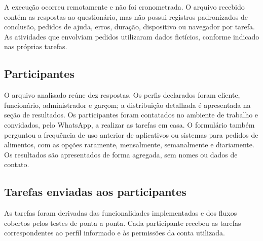 A execução ocorreu remotamente e não foi cronometrada. O arquivo recebido contém as respostas ao questionário, mas não possui registros padronizados de conclusão, pedidos de ajuda, erros, duração, dispositivo ou navegador por tarefa. As atividades que envolviam pedidos utilizaram dados fictícios, conforme indicado nas próprias tarefas.

\subsection{Participantes}

O arquivo analisado reúne dez respostas. Os perfis declarados foram cliente, funcionário, administrador e garçom; a distribuição detalhada é apresentada na seção de resultados. Os participantes foram contatados no ambiente de trabalho e convidados, pelo WhatsApp, a realizar as tarefas em casa. O formulário também perguntou a frequência de uso anterior de aplicativos ou sistemas para pedidos de alimentos, com as opções raramente, mensalmente, semanalmente e diariamente. Os resultados são apresentados de forma agregada, sem nomes ou dados de contato.

\subsection{Tarefas enviadas aos participantes}

As tarefas foram derivadas das funcionalidades implementadas e dos fluxos cobertos pelos testes de ponta a ponta. Cada participante recebeu as tarefas correspondentes ao perfil informado e às permissões da conta utilizada.

